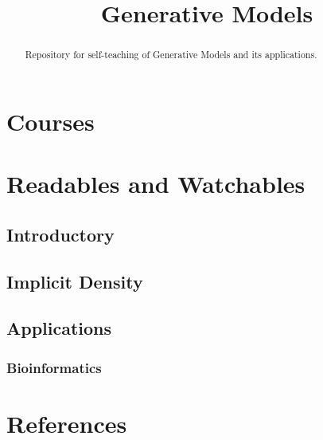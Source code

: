\documentclass[12pt]{article}
\begin{document}
\title{Generative Models}
\maketitle
\tableofcontents

\begin{abstract}
  Repository for self-teaching of Generative Models and its applications.
\end{abstract}

\section{Courses}
\section{Readables and Watchables}
  \subsection{Introductory}
  \subsection{Implicit Density}
  \subsection{Applications}
    \subsubsection{Bioinformatics}

\section{References}
\end{document}
